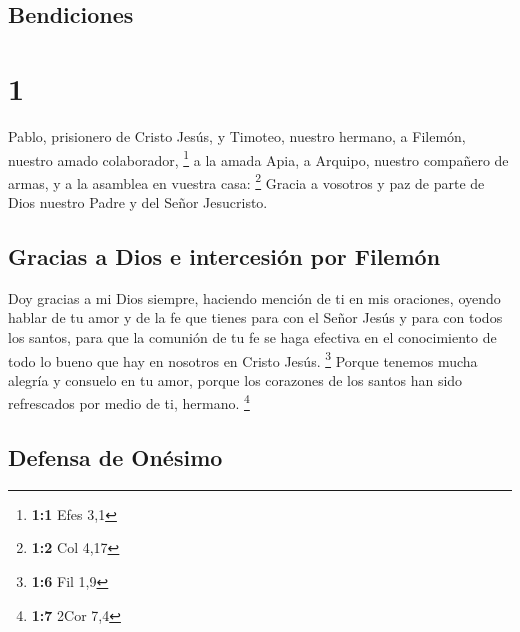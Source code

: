 \hypertarget{bendiciones}{%
\subsection{Bendiciones}\label{bendiciones}}

\hypertarget{section}{%
\section{1}\label{section}}

 Pablo, prisionero de Cristo Jesús, y Timoteo, nuestro
hermano, a Filemón, nuestro amado colaborador, \footnote{\textbf{1:1}
  Efes 3,1}  a la amada Apia, a Arquipo, nuestro compañero
de armas, y a la asamblea en vuestra casa: \footnote{\textbf{1:2} Col
  4,17}  Gracia a vosotros y paz de parte de Dios nuestro
Padre y del Señor Jesucristo.

\hypertarget{gracias-a-dios-e-intercesiuxf3n-por-filemuxf3n}{%
\subsection{Gracias a Dios e intercesión por
Filemón}\label{gracias-a-dios-e-intercesiuxf3n-por-filemuxf3n}}

 Doy gracias a mi Dios siempre, haciendo mención de ti en
mis oraciones,  oyendo hablar de tu amor y de la fe que
tienes para con el Señor Jesús y para con todos los santos,
 para que la comunión de tu fe se haga efectiva en el
conocimiento de todo lo bueno que hay en nosotros en Cristo Jesús.
\footnote{\textbf{1:6} Fil 1,9}  Porque tenemos mucha
alegría y consuelo en tu amor, porque los corazones de los santos han
sido refrescados por medio de ti, hermano. \footnote{\textbf{1:7} 2Cor
  7,4}

\hypertarget{defensa-de-onuxe9simo}{%
\subsection{Defensa de Onésimo}\label{defensa-de-onuxe9simo}}

